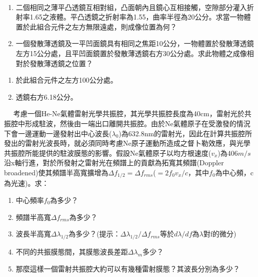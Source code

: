 \documentclass[cn,10pt,math=newtx,chinesefont=founder]{elegantbook}
\begin{document}
\newpage


\begin{example}　
    \begin{enumerate}[label=(\arabic*)]
    \item 二個相同之薄平凸透鏡互相對組，凸面朝內且鏡心互相接觸，空隙部分灌入折射率1.65之液體。平凸透鏡之折射率為1.55，曲率半徑為20公分。求當一物體置於此組合元件之左方無限遠處，則成像位置為何？
    \item 一個發散薄透鏡及一平凹面鏡具有相同之焦距10公分，一物體置於發散薄透鏡左方15公分處，且平凹面鏡置於發散薄透鏡右方30公分處。求此物體之成像相對於發散薄透鏡之位置？
    \end{enumerate}
    
    \rightline{[6]}
\end{example}

\begin{solution}
\begin{enumerate}[label=(\arabic*)]
\item 於此組合元件之左方100公分處。
\item 透鏡右方6.18公分。
\end{enumerate}
\end{solution}

\newpage


\begin{example}　
    考慮一個He-Ne氣體雷射光學共振腔，其光學共振腔長度為40cm，雷射光於共振腔中形成駐波，然後由一端出口離開共振腔。由於Ne氣體原子在受激發的情況下會一邊運動一邊發射出中心波長($\lambda_0$)為632.8nm的雷射光，因此在計算共振腔所發出的雷射光波長時，就必須同時考慮Ne原子運動所造成之督卜勒效應，與光學共振腔所能提供的駐波膜態的影響。假設Ne氣體原子以均方根速度($v_x$)為406$m/s$沿x軸行進，對於所發射之雷射光在頻譜上的貢獻為拓寬其頻譜(Doppler broadened)使其頻譜半高寬擴增為$\Delta f_{1/2}=\Delta f_{rms}$($=2f_0v_x/c$，其中$f_0$為中心頻，c為光速)。求：
    \begin{enumerate}[label=(\arabic*)]
    \item 中心頻率$f_0$為多少？
    \item 頻譜半高寬$\Delta f_{rms}$為多少？
    \item 波長半高寬$\Delta \lambda_{1/2}$為多少？(提示：$\Delta \lambda_{1/2}/\Delta f_{rms}$等於$d\lambda/df$為$\lambda$對f的微分)
    \item 不同的共振膜態間，其膜態波長差距$\Delta \lambda_m$多少？
    \item 那麼這樣一個雷射共振腔大約可以有幾種雷射膜態？其波長分別為多少？
    \end{enumerate}
    
    \rightline{[7]}
\end{example}
\end{document}
